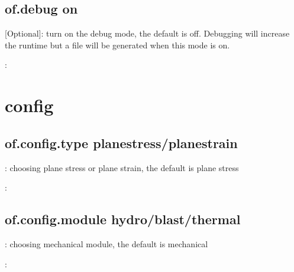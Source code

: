\documentclass[letterpaper,10pt,english]{sphinxmanual}
\begin{document}
\section{of.debug on}
\label{\detokenize{rst_tutorials/command_line_guide:of-debug-on}}
 {[}Optional{]}: turn on the debug mode, the default is off. Debugging will increase the run\sphinxhyphen{}time but a  file will
be generated when this mode is on.

:

\begin{sphinxVerbatim}[commandchars=\\\{\}]
    
\end{sphinxVerbatim}


\chapter{config}
\label{\detokenize{rst_tutorials/command_line_guide:config}}

\section{of.config.type planestress/planestrain}
\label{\detokenize{rst_tutorials/command_line_guide:of-config-type-planestress-planestrain}}
: choosing plane stress or plane strain, the default is plane stress

:

\begin{sphinxVerbatim}[commandchars=\\\{\}]
 
\end{sphinxVerbatim}


\section{of.config.module hydro/blast/thermal}
\label{\detokenize{rst_tutorials/command_line_guide:of-config-module-hydro-blast-thermal}}
: choosing mechanical module, the default is mechanical

:

\begin{sphinxVerbatim}[commandchars=\\\{\}]
 
 
 
\end{sphinxVerbatim}
\end{document}
